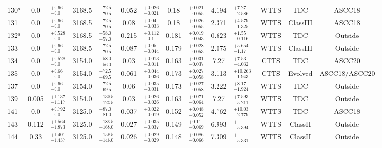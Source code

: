 \documentclass[12pt]{article}
\begin{document}
\begin{table}
\begin{threeparttable}
\begin{tabular}{lclclclclclccc}
 	130$^a $    & 0.0   & $^{+0.66 }_{-0.0  }$ & 3168.5 & $^{+72.5  }_{-70.5 }$ & 0.052 & $^{+0.026 }_{-0.021}$ & 0.18  & $^{+0.021 }_{-0.055}$ & 4.194  & $^{+7.27   }_{-2.586}$  & WTTS & TDC      & ASCC18        \\
 	131         & 0.0   & $^{+0.66 }_{-0.0  }$ & 3168.5 & $^{+72.5  }_{-70.5 }$ & 0.08  & $^{+0.04  }_{-0.033}$ & 0.18  & $^{+0.026 }_{-0.055}$ & 2.371  & $^{+4.579  }_{-1.325}$  & WTTS & ClassIII & ASCC18        \\
 	132$^a $    & 0.0   & $^{+0.528}_{-0.0  }$ & 3168.5 & $^{+58.0  }_{-57.0 }$ & 0.215 & $^{+0.112 }_{-0.1  }$ & 0.181 & $^{+0.019 }_{-0.043}$ & 0.623  & $^{+1.55   }_{-0.116}$  & WTTS & TDC      & Outside       \\
 	133         & 0.0   & $^{+0.66 }_{-0.0  }$ & 3168.5 & $^{+72.5  }_{-70.5 }$ & 0.087 & $^{+0.05  }_{-0.044}$ & 0.179 & $^{+0.028 }_{-0.053}$ & 2.075  & $^{+5.654  }_{-1.17 }$  & WTTS & ClassIII & Outside       \\
 	134         & 0.0   & $^{+0.528}_{-0.0  }$ & 3154.0 & $^{+58.0  }_{-56.0 }$ & 0.03  & $^{+0.013 }_{-0.011}$ & 0.163 & $^{+0.031 }_{-0.037}$ & 7.27   & $^{+7.53   }_{-4.032}$  & CTTS & TDC      & ASCC20        \\
 	135         & 0.0   & $^{+0.66 }_{-0.0  }$ & 3154.0 & $^{+72.5  }_{-69.5 }$ & 0.061 & $^{+0.044 }_{-0.036}$ & 0.173 & $^{+0.027 }_{-0.058}$ & 3.113  & $^{+10.263 }_{-1.943}$  & CTTS & Evolved  & ASCC18/ASCC20 \\
 	137         & 0.0   & $^{+0.66 }_{-0.0  }$ & 3154.0 & $^{+72.5  }_{-69.5 }$ & 0.06  & $^{+0.035 }_{-0.031}$ & 0.173 & $^{+0.027 }_{-0.058}$ & 3.222  & $^{+8.17   }_{-1.924}$  & WTTS & TDC      & Outside       \\
 	139         & 0.005 & $^{+1.137}_{-1.117}$ & 3154.0 & $^{+130.5 }_{-123.5}$ & 0.03  & $^{+0.026 }_{-0.026}$ & 0.163 & $^{+0.071 }_{-0.064}$ & 7.27   & $^{+7.593  }_{-5.211}$  & WTTS & TDC      & Outside       \\
 	141         & 0.0   & $^{+0.792}_{-0.0  }$ & 3125.0 & $^{+87.0  }_{-81.0 }$ & 0.037 & $^{+0.022 }_{-0.019}$ & 0.152 & $^{+0.048 }_{-0.052}$ & 4.762  & $^{+10.03  }_{-2.779}$  & WTTS & TDC      & ASCC18        \\
 	143         & 0.112 & $^{+1.564}_{-1.873}$ & 3125.0 & $^{+188.5 }_{-168.0}$ & 0.027 & $^{+0.035 }_{-0.037}$ & 0.149 & $^{+0.11  }_{-0.069}$ & 6.993  & $^{+---    }_{-5.394}$  & WTTS & ClassII  & Outside       \\
 	144         & 0.33  & $^{+1.401}_{-1.437}$ & 3125.0 & $^{+159.5 }_{-146.0}$ & 0.026 & $^{+0.029 }_{-0.029}$ & 0.148 & $^{+0.086 }_{-0.066}$ & 7.309  & $^{+---    }_{-5.331}$  & WTTS & ClassII  & Outside       \\

\end{tabular}
\end{threeparttable}
\end{table}
\end{document}
